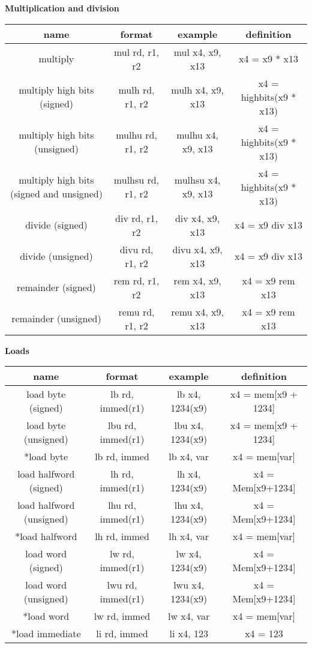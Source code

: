 \documentclass{article}
\begin{document}
\begin{center}
  \textbf{Multiplication and division}

  \begin{tabular}{|c|c|c|c|}
    \hline
    name          & format             & example          & definition    \\
    \hline
    multiply & mul rd, r1, r2 & mul x4, x9, x13 & x4 = x9 * x13 \\
    multiply high bits (signed) & mulh rd, r1, r2 & mulh x4, x9, x13 & x4 = highbits(x9 * x13) \\
    multiply high bits (unsigned) & mulhu rd, r1, r2 & mulhu x4, x9, x13 & x4 = highbits(x9 * x13) \\
    multiply high bits (signed and unsigned) & mulhsu rd, r1, r2 & mulhsu x4, x9, x13 & x4 = highbits(x9 * x13) \\
    divide (signed) & div rd, r1, r2 & div x4, x9, x13 & x4 = x9 div x13 \\
    divide (unsigned) & divu rd, r1, r2 & divu x4, x9, x13 & x4 = x9 div x13 \\
    remainder (signed) & rem rd, r1, r2 & rem x4, x9, x13 & x4 = x9 rem x13 \\
    remainder (unsigned) & remu rd, r1, r2 & remu x4, x9, x13 & x4 = x9 rem x13 \\
    \hline
  \end{tabular}

  \textbf{Loads}

  \begin{tabular}{|c|c|c|c|}
    \hline
    name            & format            & example          & definition \\
    \hline
    load byte (signed) & lb rd, immed(r1) & lb x4, 1234(x9) & x4 = mem[x9 + 1234] \\
    load byte (unsigned) & lbu rd, immed(r1) & lbu x4, 1234(x9) & x4 = mem[x9 +
    1234] \\
    *load byte & lb rd, immed & lb x4, var & x4 = mem[var] \\
    load halfword (signed) & lh rd, immed(r1) & lh x4, 1234(x9) & x4 = Mem[x9+1234] \\
    load halfword (unsigned) & lhu rd, immed(r1) & lhu x4, 1234(x9) & x4 =
    Mem[x9+1234] \\
    *load halfword & lh rd, immed & lh x4, var & x4 = mem[var] \\
    load word (signed)  & lw rd, immed(r1) & lw x4, 1234(x9) & x4 = Mem[x9+1234] \\
    load word (unsigned)  & lwu rd, immed(r1) & lwu x4, 1234(x9) & x4 =
    Mem[x9+1234] \\
    *load word & lw rd, immed & lw x4, var & x4 = mem[var] \\
    *load immediate                   & li rd, immed       & li x4, 123        & x4 = 123 \\
    \hline
  \end{tabular}


\end{center}
\end{document}
